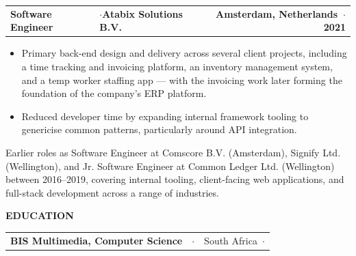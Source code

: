 \documentclass[10pt, a4paper]{article}
\newcommand{\headingbold}{\headingfont\bfseries}
\newcommand{\headingregular}{\headingfont\mdseries}
\newcommand{\cvsection}[1]{%
  \vspace{4pt}
  \begin{tcolorbox}[
    colback=sectionblue!15,
    colframe=sectionblue!15,
    sharp corners,
    boxrule=0pt,
    left=0pt, right=0pt,
    top=2pt, bottom=2pt
  ]
  \centering\small\headingfont\bfseries\scshape\color{sectionblue}\MakeUppercase{#1}
  \end{tcolorbox}
  \vspace{4pt}
}
\newcommand{\role}[4]{%
  \noindent\color{black}
  \begin{tabularx}{\textwidth}{l X r}
    \headingbold#1 & $\cdot$\quad\headingbold\small#2 & 
    {\headingbold\small#3\ \quad$\cdot$\quad #4} \\
  \end{tabularx}
}
\newcommand{\education}[4]{%
  \noindent
  \begin{tabularx}{\textwidth}{l X r}
    \headingbold#1 & $\cdot$\quad{\headingregular\small#2} & 
    {\headingregular\small#3\ \quad$\cdot$ \makebox[1.85cm][r]{#4}} \\
  \end{tabularx}
}
\begin{document}
\role{Software Engineer}{Atabix Solutions B.V.}{Amsterdam, Netherlands}{2020 \textendash\hspace{1pt}2021}
\begin{itemize}
  \color[gray]{0.3}
  \item Primary back-end design and delivery across several client projects, including a time tracking and invoicing platform, an inventory management system, and a temp worker staffing app — with the invoicing work later forming the foundation of the company's ERP platform.
  \item Reduced developer time by expanding internal framework tooling to genericise common patterns, particularly around API integration.
\end{itemize}
\vspace{8pt}

\noindent\textcolor[gray]{0.3}{\small Earlier roles as Software Engineer at Comscore B.V. (Amsterdam), Signify Ltd. (Wellington), and Jr. Software Engineer at Common Ledger Ltd. (Wellington) between 2016–2019, covering internal tooling, client-facing web applications, and full-stack development across a range of industries.}


\cvsection{Education}
\education{BIS Multimedia, Computer Science}{University of Pretoria}{South Africa}{2013 \textendash\hspace{1pt} 2015}
\end{document}
